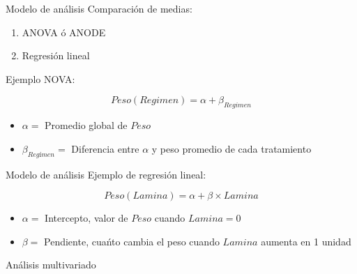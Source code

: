 \documentclass[
  11pt,
  ignorenonframetext,
]{beamer}
\providecommand{\tightlist}{%
  \setlength{\itemsep}{0pt}\setlength{\parskip}{0pt}}
\begin{document}
\begin{frame}{Modelo de análisis}
\protect\hypertarget{modelo-de-anuxe1lisis}{}
Comparación de medias:

\begin{enumerate}
\tightlist
\item
  ANOVA ó ANODE
\item
  Regresión lineal
\end{enumerate}

Ejemplo NOVA:

\[ Peso(Regimen) =  \alpha + \beta_{Regimen} \]

\begin{itemize}
\tightlist
\item
  \(\alpha =\) Promedio global de \(Peso\)
\item
  \(\beta_{Regímen} =\) Diferencia entre \(\alpha\) y peso promedio de
  cada tratamiento
\end{itemize}
\end{frame}

\begin{frame}{Modelo de análisis}
\protect\hypertarget{modelo-de-anuxe1lisis-1}{}
Ejemplo de regresión lineal:

\[ Peso(Lamina) = \alpha + \beta \times Lamina \]

\begin{itemize}
\tightlist
\item
  \(\alpha =\) Intercepto, valor de \(Peso\) cuando \(Lamina = 0\)
\item
  \(\beta =\) Pendiente, cuańto cambia el peso cuando \(Lamina\) aumenta
  en 1 unidad
\end{itemize}
\end{frame}

\begin{frame}{Análisis multivariado}
\protect\hypertarget{anuxe1lisis-multivariado}{}
\end{frame}
\end{document}
